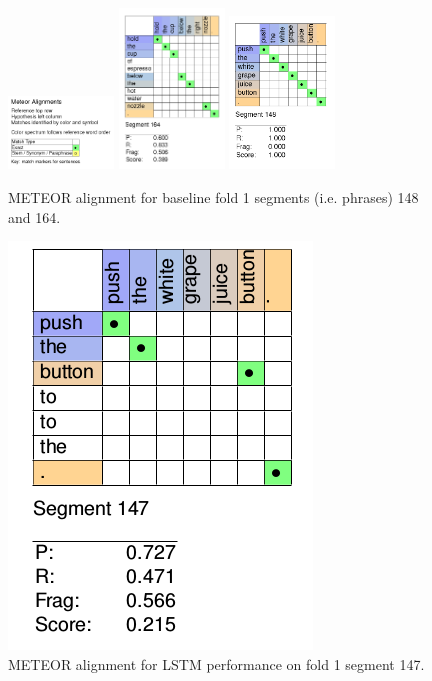 \documentclass[letterpaper, 12 pt, conference]{ieeeconf}
\begin{document}
\begin{figure}[htb!]
  \centering
  \includegraphics[width=0.25\textwidth]{meteor_alignment_key}
  \includegraphics[width=0.25\textwidth]{fold_1_sentence_164}
  \includegraphics[width=0.25\textwidth]{fold_1_sentence_148}
  \caption{METEOR alignment for baseline fold 1 segments (i.e. phrases) 148 and 164.}
  \label{fig:fold_1_sentence_164}
\end{figure}

\begin{figure}[h]
\centering
\includegraphics[scale=0.35]{lstm_alignment}
\caption{METEOR alignment for LSTM performance on fold 1 segment 147.} 
\label{fig:lstm_alignment}
\end{figure}
\end{document}
